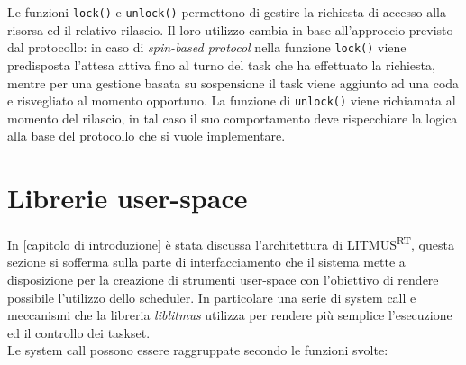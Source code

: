 \begin{appendices}
\noindent Le funzioni \texttt{lock()} e \texttt{unlock()} permettono di gestire la richiesta di accesso alla risorsa ed il relativo rilascio. Il loro utilizzo cambia in base all'approccio previsto dal protocollo: in caso di \textit{spin-based protocol} nella funzione \texttt{lock()} viene predisposta l'attesa attiva fino al turno del task che ha effettuato la richiesta, mentre per una gestione basata su sospensione il task viene aggiunto ad una coda e risvegliato al momento opportuno. La funzione di \texttt{unlock()} viene richiamata al momento del rilascio, in tal caso il suo comportamento deve rispecchiare la logica alla base del protocollo che si vuole implementare.\\

\section{Librerie user-space}
\label{sec:liblitmus}

\noindent In [capitolo di introduzione] è stata discussa l'architettura di LITMUS\textsuperscript{RT}, questa sezione si sofferma sulla parte di interfacciamento che il sistema mette a disposizione per la creazione di strumenti user-space con l'obiettivo di rendere possibile l'utilizzo dello scheduler. In particolare una serie di system call e meccanismi che la libreria \textit{liblitmus} utilizza per rendere più semplice l'esecuzione ed il controllo dei taskset.\\

\noindent Le system call possono essere raggruppate secondo le funzioni svolte: \\


\end{appendices}
